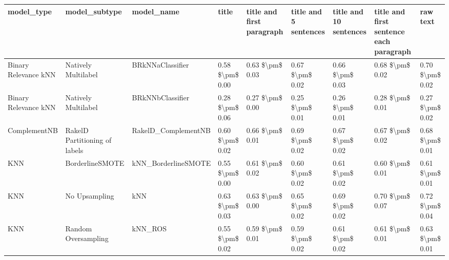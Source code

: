 \begin{tabular}{lllllllll}
\toprule
                     model\_type &                 model\_subtype &                                   model\_name &           title & title and first paragraph & title and 5 sentences & title and 10 sentences & title and first sentence each paragraph &        raw text \\
\midrule
           Binary Relevance kNN &           Natively Multilabel &                             BRkNNaClassifier & 0.58 \$\textbackslash pm\$ 0.00 &           0.63 \$\textbackslash pm\$ 0.03 &       0.67 \$\textbackslash pm\$ 0.02 &        0.66 \$\textbackslash pm\$ 0.03 &                         0.68 \$\textbackslash pm\$ 0.02 & 0.70 \$\textbackslash pm\$ 0.02 \\
           Binary Relevance kNN &           Natively Multilabel &                             BRkNNbClassifier & 0.28 \$\textbackslash pm\$ 0.06 &           0.27 \$\textbackslash pm\$ 0.00 &       0.25 \$\textbackslash pm\$ 0.01 &        0.26 \$\textbackslash pm\$ 0.01 &                         0.28 \$\textbackslash pm\$ 0.01 & 0.27 \$\textbackslash pm\$ 0.02 \\
                   ComplementNB & RakelD Partitioning of labels &                          RakelD\_ComplementNB & 0.60 \$\textbackslash pm\$ 0.02 &           0.66 \$\textbackslash pm\$ 0.01 &       0.69 \$\textbackslash pm\$ 0.02 &        0.67 \$\textbackslash pm\$ 0.02 &                         0.67 \$\textbackslash pm\$ 0.02 & 0.68 \$\textbackslash pm\$ 0.01 \\
                            KNN &               BorderlineSMOTE &                          kNN\_BorderlineSMOTE & 0.55 \$\textbackslash pm\$ 0.00 &           0.61 \$\textbackslash pm\$ 0.02 &       0.60 \$\textbackslash pm\$ 0.02 &        0.61 \$\textbackslash pm\$ 0.02 &                         0.60 \$\textbackslash pm\$ 0.01 & 0.61 \$\textbackslash pm\$ 0.01 \\
                            KNN &                 No Upsampling &                                          kNN & 0.63 \$\textbackslash pm\$ 0.03 &           0.63 \$\textbackslash pm\$ 0.00 &       0.65 \$\textbackslash pm\$ 0.02 &        0.69 \$\textbackslash pm\$ 0.02 &                         0.70 \$\textbackslash pm\$ 0.07 & 0.72 \$\textbackslash pm\$ 0.04 \\
                            KNN &           Random Oversampling &                                      kNN\_ROS & 0.55 \$\textbackslash pm\$ 0.02 &           0.59 \$\textbackslash pm\$ 0.01 &       0.59 \$\textbackslash pm\$ 0.02 &        0.61 \$\textbackslash pm\$ 0.02 &                         0.61 \$\textbackslash pm\$ 0.01 & 0.63 \$\textbackslash pm\$ 0.01 \\

\end{tabular}
